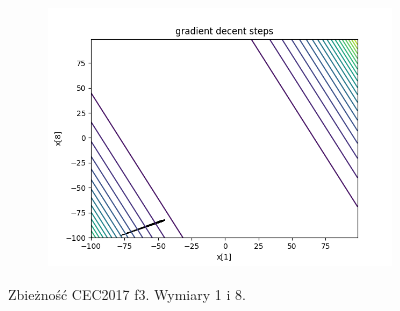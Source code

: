 \begin{figure}[h!]
\begin{subfigure}[b]{0.45\linewidth}
			\includegraphics[width=\linewidth]{photos/f3_3_0.png}
		\end{subfigure}
		\caption{Zbieżność CEC2017 f3. Wymiary 1 i 8.}
	\end{figure}
	\newpage

